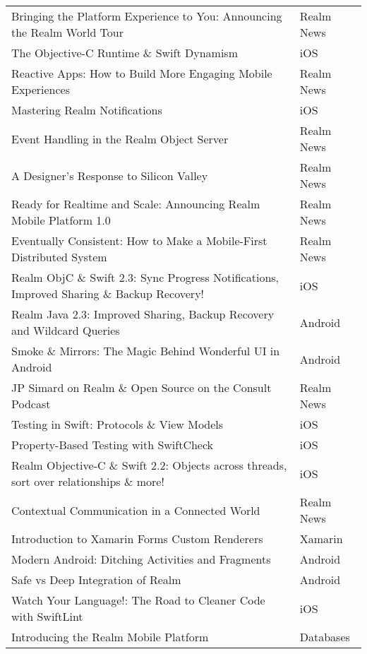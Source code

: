 \documentclass[letterpaper,11pt]{article}
\begin{document}
\begin{table}[htb]
\begin{tabular}{ | l | l |}
Bringing the Platform Experience to You: Announcing the Realm World Tour & Realm News \\ 
The Objective-C Runtime \& Swift Dynamism & iOS \\ 
Reactive Apps: How to Build More Engaging Mobile Experiences & Realm News \\ 
Mastering Realm Notifications & iOS \\ 
Event Handling in the Realm Object Server & Realm News \\ 
A Designer’s Response to Silicon Valley & Realm News \\ 
Ready for Realtime and Scale: Announcing Realm Mobile Platform 1.0 & Realm News \\ 
Eventually Consistent: How to Make a Mobile-First Distributed System & Realm News \\ 
Realm ObjC \& Swift 2.3: Sync Progress Notifications, Improved Sharing \& Backup Recovery! & iOS \\ 
Realm Java 2.3: Improved Sharing, Backup Recovery and Wildcard Queries & Android \\ 
Smoke \& Mirrors: The Magic Behind Wonderful UI in Android & Android \\ 
JP Simard on Realm \& Open Source on the Consult Podcast & Realm News \\ 
Testing in Swift: Protocols \& View Models & iOS \\ 
Property-Based Testing with SwiftCheck & iOS \\ 
Realm Objective-C \& Swift 2.2: Objects across threads, sort over relationships \& more! & iOS  \\ 
Contextual Communication in a Connected World & Realm News \\ 
Introduction to Xamarin Forms Custom Renderers & Xamarin \\ 
Modern Android: Ditching Activities and Fragments & Android  \\ 
Safe vs Deep Integration of Realm & Android \\ 
Watch Your Language!: The Road to Cleaner Code with SwiftLint & iOS \\ 
Introducing the Realm Mobile Platform & Databases \\ 
\hline
\end{tabular}
\caption{}
\label{table:q1csvtable}
\end{table}



\end{document}

